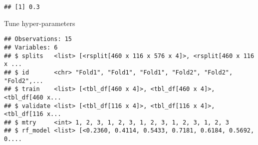 \documentclass[]{article}
\newenvironment{Shaded}{\begin{snugshade}}{\end{snugshade}}
\newcommand{\KeywordTok}[1]{\textcolor[rgb]{0.13,0.29,0.53}{\textbf{#1}}}
\newcommand{\DataTypeTok}[1]{\textcolor[rgb]{0.13,0.29,0.53}{#1}}
\newcommand{\DecValTok}[1]{\textcolor[rgb]{0.00,0.00,0.81}{#1}}
\newcommand{\StringTok}[1]{\textcolor[rgb]{0.31,0.60,0.02}{#1}}
\newcommand{\CommentTok}[1]{\textcolor[rgb]{0.56,0.35,0.01}{\textit{#1}}}
\newcommand{\OperatorTok}[1]{\textcolor[rgb]{0.81,0.36,0.00}{\textbf{#1}}}
\newcommand{\NormalTok}[1]{#1}
\begin{document}
\begin{verbatim}
## [1] 0.3
\end{verbatim}

Tune hyper-parameters

\begin{Shaded}
\end{Shaded}

\begin{verbatim}
## Observations: 15
## Variables: 6
## $ splits   <list> [<rsplit[460 x 116 x 576 x 4]>, <rsplit[460 x 116 x ...
## $ id       <chr> "Fold1", "Fold1", "Fold1", "Fold2", "Fold2", "Fold2",...
## $ train    <list> [<tbl_df[460 x 4]>, <tbl_df[460 x 4]>, <tbl_df[460 x...
## $ validate <list> [<tbl_df[116 x 4]>, <tbl_df[116 x 4]>, <tbl_df[116 x...
## $ mtry     <int> 1, 2, 3, 1, 2, 3, 1, 2, 3, 1, 2, 3, 1, 2, 3
## $ rf_model <list> [<0.2360, 0.4114, 0.5433, 0.7181, 0.6184, 0.5692, 0....
\end{verbatim}
\end{document}
